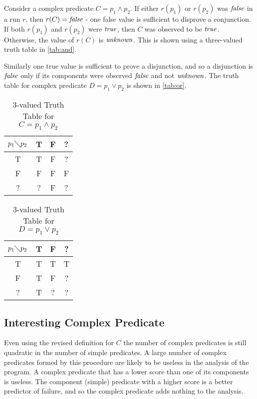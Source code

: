 Consider a complex predicate $C = p_1 \wedge p_2$.  If either $r(p_1)$ or $r(p_2)$ was $\mathit{false}$ in a run $r$, then $r(C) = \mathit{false}$ - one false value is sufficient to disprove a conjunction.  If both $r(p_1)$ and $r(p_2)$ were $\mathit{true}$, then $C$ was observed to be $\mathit{true}$.  Otherwise, the value of $r(C)$ is $\mathit{unknown}$. This is shown using a three-valued truth table in \autoref{tab:and}.

Similarly one true value is sufficient to prove a disjunction, and so a disjunction is $\mathit{false}$ only if its components were observed $\mathit{false}$ and not $\mathit{unknown}$.  The truth table for complex predicate $D = p_1 \vee p_2$ is shown in \autoref{tab:or}.

\begin{table}
  \caption{3-valued Truth Table for $C = p_1 \wedge p_2$}
  \label{tab:and}
  \centering
  \begin{tabular}{c|ccc}
    $p_1 \diagdown p_2$ & T & F & ? \\
    \hline
    T & T & F & ? \\
    F & F & F & F \\
    ? & ? & F & ? \\
  \end{tabular}
\end{table}


\begin{table}
  \caption{3-valued Truth Table for $D = p_1 \vee p_2$}
  \label{tab:or}
  \centering
  \begin{tabular}{c|ccc}
    $p_1 \diagdown p_2$ & T & F & ? \\
    \hline
    T & T & T & T \\
    F & T & F & ? \\
    ? & T & ? & ? \\
  \end{tabular}
\end{table}

\subsection{Interesting Complex Predicate}
Even using the revised definition for $C$ the number of complex predicates is still quadratic in the number of simple predicates.  A large number of complex predicates formed by this procedure are likely to be useless in the analysis of the program.  A complex predicate that has a lower score than one of its components is useless.  The component (simple) predicate with a higher score is a better predictor of failure, and so the complex predicate adds nothing to the analysis.


